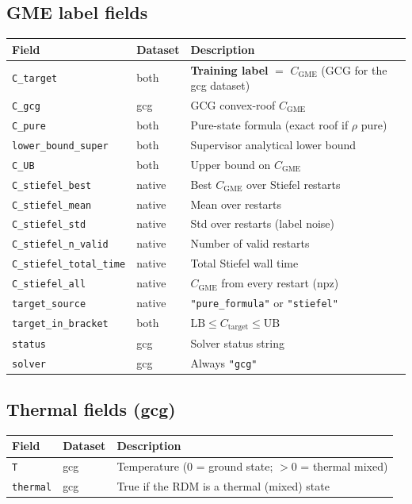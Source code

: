 \documentclass[11pt]{article}
\newcommand{\code}[1]{\texttt{\small #1}}
\newcommand{\CGME}{\ensuremath{C_{\mathrm{GME}}}}
\begin{document}
\subsection{GME label fields}
\begin{longtable}{@{}p{2.9cm}p{1.6cm}p{8.8cm}@{}}
\toprule
Field & Dataset & Description \\ \midrule \endhead
\code{C\_target}            & both   & \textbf{Training label} $=$ \CGME{} (GCG for the gcg dataset) \\
\code{C\_gcg}               & gcg    & GCG convex-roof \CGME{} \\
\code{C\_pure}              & both   & Pure-state formula (exact roof if $\rho$ pure) \\
\code{lower\_bound\_super}  & both   & Supervisor analytical lower bound \\
\code{C\_UB}                & both   & Upper bound on \CGME{} \\
\code{C\_stiefel\_best}     & native & Best \CGME{} over Stiefel restarts \\
\code{C\_stiefel\_mean}     & native & Mean over restarts \\
\code{C\_stiefel\_std}      & native & Std over restarts (label noise) \\
\code{C\_stiefel\_n\_valid} & native & Number of valid restarts \\
\code{C\_stiefel\_total\_time} & native & Total Stiefel wall time \\
\code{C\_stiefel\_all}      & native & \CGME{} from every restart (npz) \\
\code{target\_source}       & native & \code{"pure\_formula"} or \code{"stiefel"} \\
\code{target\_in\_bracket}  & both   & $\text{LB}\le C_{\text{target}}\le\text{UB}$ \\
\code{status}               & gcg    & Solver status string \\
\code{solver}               & gcg    & Always \code{"gcg"} \\
\bottomrule
\end{longtable}

\subsection{Thermal fields (gcg)}
\begin{longtable}{@{}p{2.4cm}p{1.6cm}p{9.3cm}@{}}
\toprule
Field & Dataset & Description \\ \midrule \endhead
\code{T}       & gcg & Temperature (0 = ground state; $>0$ = thermal mixed) \\
\code{thermal} & gcg & True if the RDM is a thermal (mixed) state \\
\bottomrule
\end{longtable}
\end{document}
